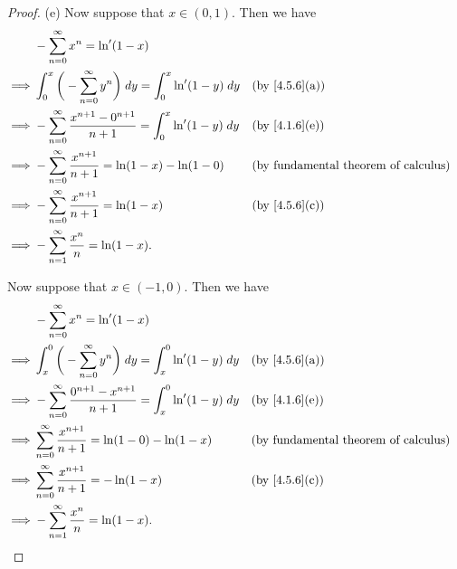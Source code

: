 \begin{proof}{(e)}
  Now suppose that \(x \in (0, 1)\).
  Then we have
  \begin{align*}
             & - \sum_{n = 0}^\infty x^n = \ln'(1 - x)                                                                                                  \\
    \implies & \int_0^x \bigg(- \sum_{n = 0}^\infty y^n\bigg) \; dy = \int_0^x \ln'(1 - y) \; dy       &  & \text{(by \cref{4.5.6}(a))}                 \\
    \implies & - \sum_{n = 0}^\infty \dfrac{x^{n + 1} - 0^{n + 1}}{n + 1} = \int_0^x \ln'(1 - y) \; dy &  & \text{(by \cref{4.1.6}(e))}                 \\
    \implies & - \sum_{n = 0}^\infty \dfrac{x^{n + 1}}{n + 1} = \ln(1 - x) - \ln(1 - 0)                &  & \text{(by fundamental theorem of calculus)} \\
    \implies & - \sum_{n = 0}^\infty \dfrac{x^{n + 1}}{n + 1} = \ln(1 - x)                             &  & \text{(by \cref{4.5.6}(c))}                 \\
    \implies & - \sum_{n = 1}^\infty \dfrac{x^n}{n} = \ln(1 - x).
  \end{align*}

  Now suppose that \(x \in (-1, 0)\).
  Then we have
  \begin{align*}
             & - \sum_{n = 0}^\infty x^n = \ln'(1 - x)                                                                                                  \\
    \implies & \int_x^0 \bigg(- \sum_{n = 0}^\infty y^n\bigg) \; dy = \int_x^0 \ln'(1 - y) \; dy       &  & \text{(by \cref{4.5.6}(a))}                 \\
    \implies & - \sum_{n = 0}^\infty \dfrac{0^{n + 1} - x^{n + 1}}{n + 1} = \int_x^0 \ln'(1 - y) \; dy &  & \text{(by \cref{4.1.6}(e))}                 \\
    \implies & \sum_{n = 0}^\infty \dfrac{x^{n + 1}}{n + 1} = \ln(1 - 0) - \ln(1 - x)                  &  & \text{(by fundamental theorem of calculus)} \\
    \implies & \sum_{n = 0}^\infty \dfrac{x^{n + 1}}{n + 1} = -\ln(1 - x)                              &  & \text{(by \cref{4.5.6}(c))}                 \\
    \implies & - \sum_{n = 1}^\infty \dfrac{x^n}{n} = \ln(1 - x).
  \end{align*}


\end{proof}
